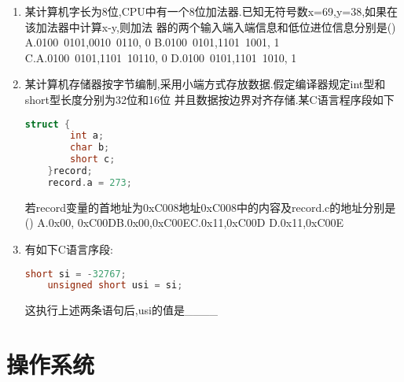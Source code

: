 \documentclass[12pt, a4paper, oneside, UTF8]{ctexbook}
\begin{document}
\begin{enumerate}
    \item 某计算机字长为8位,CPU中有一个8位加法器.已知无符号数x=69,y=38,如果在该加法器中计算x-y,则加法
    器的两个输入端入端信息和低位进位信息分别是() \\
    A.0100\ 0101,0010\ 0110, 0 \qquad B.0100\ 0101,1101\ 1001, 1 \\
    C.A.0100\ 0101,1101\ 10110, 0 \qquad D.0100\ 0101,1101\ 1010, 1
    \item 某计算机存储器按字节编制,采用小端方式存放数据.假定编译器规定int型和short型长度分别为32位和16位
    并且数据按边界对齐存储.某C语言程序段如下
\begin{lstlisting}[language=C]
    struct {
        int a;
        char b;
        short c;
    }record;
    record.a = 273;
\end{lstlisting}
    若record变量的首地址为0xC008地址0xC008中的内容及record.c的地址分别是()
    A.0x00, 0xC00D\qquad B.0x00,0xC00E\qquad C.0x11,0xC00D \qquad D.0x11,0xC00E 

    \item 有如下C语言序段:
\begin{lstlisting}[language=C]
    short si = -32767;
    unsigned short usi = si;
\end{lstlisting}
    这执行上述两条语句后,usi的值是\_\_\_\_ 
\end{enumerate}

\newpage
\section{操作系统}
\end{document}

